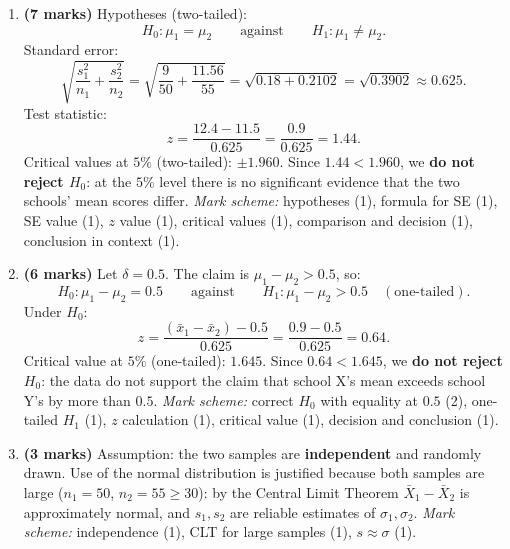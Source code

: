 \documentclass[11pt]{article}
\begin{document}
\begin{corrige}
\begin{enumerate}
\item \textbf{(7 marks)} Hypotheses (two-tailed):
\[ H_0:\mu_1=\mu_2\qquad\text{against}\qquad H_1:\mu_1\neq\mu_2. \]
Standard error:
\[ \sqrt{\frac{s_1^2}{n_1}+\frac{s_2^2}{n_2}}=\sqrt{\frac{9}{50}+\frac{11.56}{55}}=\sqrt{0.18+0.2102}=\sqrt{0.3902}\approx 0.625. \]
Test statistic:
\[ z=\frac{12.4-11.5}{0.625}=\frac{0.9}{0.625}=1.44. \]
Critical values at $5\%$ (two-tailed): $\pm 1.960$. Since $1.44<1.960$, we \textbf{do not reject $H_0$}: at the $5\%$ level there is no significant evidence that the two schools' mean scores differ. \emph{Mark scheme:} hypotheses (1), formula for SE (1), SE value (1), $z$ value (1), critical values (1), comparison and decision (1), conclusion in context (1).
\item \textbf{(6 marks)} Let $\delta=0.5$. The claim is $\mu_1-\mu_2>0.5$, so:
\[ H_0:\mu_1-\mu_2=0.5\qquad\text{against}\qquad H_1:\mu_1-\mu_2>0.5\quad(\text{one-tailed}). \]
Under $H_0$:
\[ z=\frac{(\bar{x}_1-\bar{x}_2)-0.5}{0.625}=\frac{0.9-0.5}{0.625}=0.64. \]
Critical value at $5\%$ (one-tailed): $1.645$. Since $0.64<1.645$, we \textbf{do not reject $H_0$}: the data do not support the claim that school X's mean exceeds school Y's by more than $0.5$. \emph{Mark scheme:} correct $H_0$ with equality at $0.5$ (2), one-tailed $H_1$ (1), $z$ calculation (1), critical value (1), decision and conclusion (1).
\item \textbf{(3 marks)} Assumption: the two samples are \textbf{independent} and randomly drawn. Use of the normal distribution is justified because both samples are large ($n_1=50$, $n_2=55\geq 30$): by the Central Limit Theorem $\bar{X}_1-\bar{X}_2$ is approximately normal, and $s_1,s_2$ are reliable estimates of $\sigma_1,\sigma_2$. \emph{Mark scheme:} independence (1), CLT for large samples (1), $s\approx\sigma$ (1).
\end{enumerate}
\end{corrige}
\end{document}

